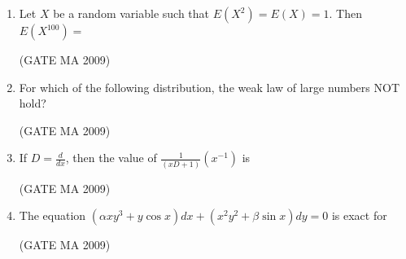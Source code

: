 \documentclass[journal,12pt,onecolumn]{IEEEtran}
\theoremstyle{remark}
\begin{document}
\begin{enumerate}
\item Let $X$ be a random variable such that $E(X^2)=E(X)=1$. Then $E(X^{100})=$
\begin{enumerate}
\end{enumerate}
\hfill (GATE MA 2009)

\item For which of the following distribution, the weak law of large numbers NOT hold?
\begin{enumerate}
\end{enumerate}
\hfill (GATE MA 2009)

\item If $D=\frac{d}{dx}$, then the value of $\frac{1}{(xD+1)}(x^{-1})$ is
\begin{enumerate}
\end{enumerate}
\hfill (GATE MA 2009)

\item The equation $(\alpha x y^3 + y\cos x)dx + (x^2y^2 + \beta\sin x)dy=0$ is exact for
\begin{enumerate}
\end{enumerate}
\hfill (GATE MA 2009)

\end{enumerate}
\end{document}
